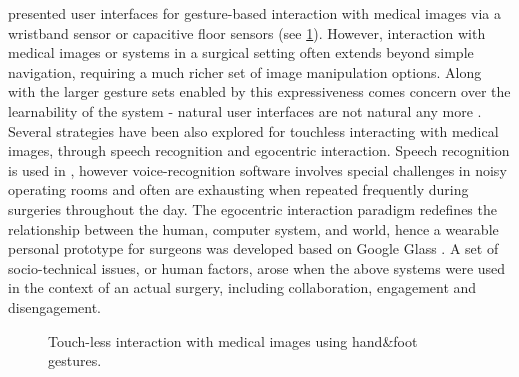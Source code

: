 \citet{Jalaliniya2013} presented user interfaces for gesture-based interaction with medical images via a wristband sensor or capacitive floor sensors (see \figurename{\ref{fig:2-bg:HandFootGesture}}). However, interaction with medical images or systems in a surgical setting often extends beyond simple navigation, requiring a much richer set of image manipulation options. 
Along with the larger gesture sets enabled by this expressiveness comes concern over the learnability of the system - natural user interfaces are not natural any more \cite{Norman2010a,Schwarz2011a}. 
Several strategies have been also explored for touchless interacting with medical images, through speech recognition and egocentric interaction. 
Speech recognition is used in \cite{Ebert2012}, however voice-recognition software involves special challenges in noisy operating rooms and often are exhausting when repeated frequently during surgeries throughout the day. The egocentric interaction paradigm \cite{Pederson2010} redefines the relationship between the human, computer system, and world, hence a wearable personal prototype for surgeons was developed based on Google Glass \cite{Jalaliniya2015}.
A set of socio-technical issues, or human factors, arose when the above systems were used in the context of an actual surgery, including collaboration, engagement and disengagement.
\begin{figure}
	\centering
	\qquad
	\caption{Touch-less interaction with medical images using hand\&foot gestures.}
	\label{fig:2-bg:HandFootGesture}
\end{figure}

